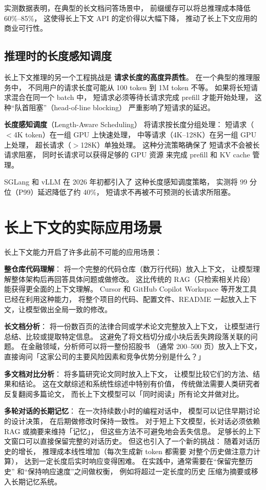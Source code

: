 实测数据表明，在典型的长文档问答场景中，
前缀缓存可以将总推理成本降低 60\%--85\%，
这使得长上下文 API 的定价得以大幅下降，
推动了长上下文应用的商业可行性。

\subsection{推理时的长度感知调度}

长上下文推理的另一个工程挑战是
\textbf{请求长度的高度异质性}。
在一个典型的推理服务中，
不同用户的请求长度可能从 100 token 到 1M token 不等。
如果将长短请求混合在同一个 batch 中，
短请求必须等待长请求完成 prefill 才能开始处理，
这种“队首阻塞”（head-of-line blocking）
严重影响了短请求的延迟。

\textbf{长度感知调度}（Length-Aware Scheduling）
将请求按长度分组处理：
短请求（$<$4K token）在一组 GPU 上快速处理，
中等请求（4K--128K）在另一组 GPU 上处理，
超长请求（$>$128K）单独处理。
这种分流策略确保了
短请求不会被长请求阻塞，
同时长请求可以获得足够的 GPU 资源
来完成 prefill 和 KV cache 管理。

SGLang 和 vLLM 在 2026 年初都引入了
这种长度感知调度策略，
实测将 99 分位（P99）延迟降低了约 40\%，
短请求不再被不可预测的长请求所阻塞。

\section{长上下文的实际应用场景}

长上下文能力开启了许多此前不可能的应用场景：

\textbf{整仓库代码理解}：
将一个完整的代码仓库（数万行代码）放入上下文，
让模型理解整体架构后再回答具体问题或做修改。
这比传统的 RAG（只检索相关片段）
能获得更全面的上下文理解。
Cursor 和 GitHub Copilot Workspace 等开发工具
已经在利用这种能力，
将整个项目的代码、配置文件、README
一起放入上下文，让模型做出全局一致的修改。

\textbf{长文档分析}：
将一份数百页的法律合同或学术论文完整放入上下文，
让模型进行总结、比较或提取特定信息。
这避免了将文档切分成小块后丢失跨段落关联的问题。
在金融领域，分析师可以将一整份招股书
（通常 200--500 页）放入上下文，
直接询问「这家公司的主要风险因素和竞争优势分别是什么？」

\textbf{多文档对比分析}：
将多篇研究论文同时放入上下文，
让模型比较它们的方法、结果和结论。
这在文献综述和系统性综述中特别有价值，
传统做法需要人类研究者反复翻阅多篇论文，
而长上下文模型可以「同时阅读」所有论文并做对比。

\textbf{多轮对话的长期记忆}：
在一次持续数小时的编程对话中，
模型可以记住早期讨论的设计决策，
在后期做修改时保持一致性。
对于短上下文模型，长对话必须依赖
RAG 或摘要来维持「记忆」，
但这些方法不可避免地会丢失信息。
足够长的上下文窗口可以直接保留完整的对话历史。
但这也引入了一个新的挑战：
随着对话历史的增长，
推理成本线性增加（每次生成新 token 都需要
对整个历史做注意力计算），
达到一定长度后实时响应变得困难。
在实践中，通常需要在“保留完整历史”
和“保持响应速度”之间做权衡，
例如将超过一定长度的历史
压缩为摘要或移入长期记忆系统。


